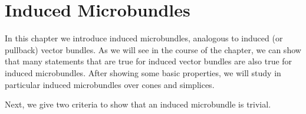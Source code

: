 \chapter{Induced Microbundles}\label{chapter::induced}
\begin{myparagraph}
    In this chapter we introduce induced microbundles,
    analogous to induced (or pullback) vector bundles.
    As we will see in the course of the chapter,
    we can show that many statements that are true for
    induced vector bundles are also true for induced microbundles.
    After showing some basic properties,
    we will study in particular induced microbundles over cones and simplices.
\end{myparagraph}


\begin{myparagraph}
    Next, we give two criteria to show that an induced microbundle is trivial.
\end{myparagraph}




